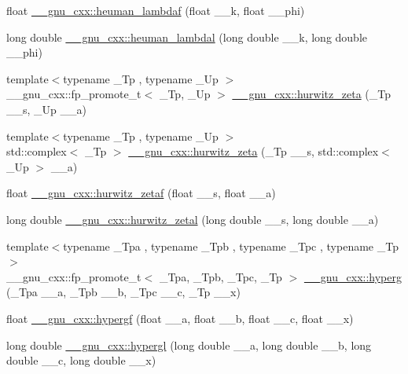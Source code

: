 \begin{DoxyCompactItemize}
\item 
float \hyperlink{group__mathsf__gnu_ga10cf5d54d985aa3a58cb197601040ac8}{\+\_\+\+\_\+gnu\+\_\+cxx\+::heuman\+\_\+lambdaf} (float \+\_\+\+\_\+k, float \+\_\+\+\_\+phi)
\item 
long double \hyperlink{group__mathsf__gnu_gadadaeb83b3d9c2fccd33ab8ec3188df5}{\+\_\+\+\_\+gnu\+\_\+cxx\+::heuman\+\_\+lambdal} (long double \+\_\+\+\_\+k, long double \+\_\+\+\_\+phi)
\item 
{\footnotesize template$<$typename \+\_\+\+Tp , typename \+\_\+\+Up $>$ }\\\+\_\+\+\_\+gnu\+\_\+cxx\+::fp\+\_\+promote\+\_\+t$<$ \+\_\+\+Tp, \+\_\+\+Up $>$ \hyperlink{group__mathsf__gnu_ga7b167ce1c8d9aa6aad40fc83a95733bd}{\+\_\+\+\_\+gnu\+\_\+cxx\+::hurwitz\+\_\+zeta} (\+\_\+\+Tp \+\_\+\+\_\+s, \+\_\+\+Up \+\_\+\+\_\+a)
\item 
{\footnotesize template$<$typename \+\_\+\+Tp , typename \+\_\+\+Up $>$ }\\std\+::complex$<$ \+\_\+\+Tp $>$ \hyperlink{group__mathsf__gnu_gaa7f0d1fbba9d2ce07a30d907302d527f}{\+\_\+\+\_\+gnu\+\_\+cxx\+::hurwitz\+\_\+zeta} (\+\_\+\+Tp \+\_\+\+\_\+s, std\+::complex$<$ \+\_\+\+Up $>$ \+\_\+\+\_\+a)
\item 
float \hyperlink{group__mathsf__gnu_gaa745d7f2edde060ed2f22817ad89df1f}{\+\_\+\+\_\+gnu\+\_\+cxx\+::hurwitz\+\_\+zetaf} (float \+\_\+\+\_\+s, float \+\_\+\+\_\+a)
\item 
long double \hyperlink{group__mathsf__gnu_gad8f2cfc7e198755968bae35d46b49d5a}{\+\_\+\+\_\+gnu\+\_\+cxx\+::hurwitz\+\_\+zetal} (long double \+\_\+\+\_\+s, long double \+\_\+\+\_\+a)
\item 
{\footnotesize template$<$typename \+\_\+\+Tpa , typename \+\_\+\+Tpb , typename \+\_\+\+Tpc , typename \+\_\+\+Tp $>$ }\\\+\_\+\+\_\+gnu\+\_\+cxx\+::fp\+\_\+promote\+\_\+t$<$ \+\_\+\+Tpa, \+\_\+\+Tpb, \+\_\+\+Tpc, \+\_\+\+Tp $>$ \hyperlink{group__mathsf__gnu_ga374198e4076f9e23f3878ca3af70e6da}{\+\_\+\+\_\+gnu\+\_\+cxx\+::hyperg} (\+\_\+\+Tpa \+\_\+\+\_\+a, \+\_\+\+Tpb \+\_\+\+\_\+b, \+\_\+\+Tpc \+\_\+\+\_\+c, \+\_\+\+Tp \+\_\+\+\_\+x)
\item 
float \hyperlink{group__mathsf__gnu_gac4c81e4ea9cef149fe40291ca10d7e15}{\+\_\+\+\_\+gnu\+\_\+cxx\+::hypergf} (float \+\_\+\+\_\+a, float \+\_\+\+\_\+b, float \+\_\+\+\_\+c, float \+\_\+\+\_\+x)
\item 
long double \hyperlink{group__mathsf__gnu_ga9961967087216e97f76283f29e1be152}{\+\_\+\+\_\+gnu\+\_\+cxx\+::hypergl} (long double \+\_\+\+\_\+a, long double \+\_\+\+\_\+b, long double \+\_\+\+\_\+c, long double \+\_\+\+\_\+x)

\end{DoxyCompactItemize}
